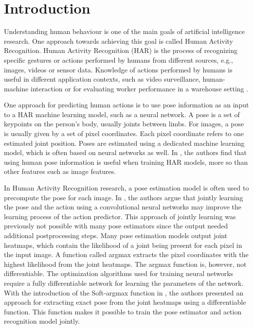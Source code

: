 \chapter{Introduction}

Understanding human behaviour is one of the main goals of artificial intelligence research.
One approach towards achieving this goal is called Human Activity Recognition. 
Human Activity Recognition (HAR) is the process of recognizing specific gestures or actions performed by humans from different sources, e.g., images, videos or sensor data.
Knowledge of actions performed by humans is useful in different application contexts, such as video surveillance, human-machine interaction or
for evaluating worker performance in a warehouse setting \cite{reining_towards_2018}.

One approach for predicting human actions is to use pose information as an input to a HAR machine learning model, such as a neural network.
A pose is a set of keypoints on the person's body, usually joints between limbs.
For images, a pose is usually given by a set of pixel coordinates.
Each pixel coordinate refers to one estimated joint position.
Poses are estimated using a dedicated machine learning model, which is often based on neural networks as well.
In \cite{jhuang_towards_2013}, the authors find that using human pose information is useful when training HAR models, more so than other features such as image features.

In Human Activity Recognition research, a pose estimation model is often used to precompute the pose for each image.
In \cite{luvizon_2d/3d_2018}, the authors argue that jointly learning the pose and the action using a convolutional neural networks may improve the learning process of the action predictor.
This approach of jointly learning was previously not possible with many pose estimators since the output needed additional postprocessing steps.
Many pose estimation models output joint heatmaps, which contain the likelihood of a joint being present for each pixel in the input image.
A function called argmax extracts the pixel coordinates with the highest likelihood from the joint heatmaps.
The argmax function is, however, not differentiable.
The optimization algorithms used for training neural networks require a fully differentiable network for learning the parameters of the network.
With the introduction of the Soft-argmax function in \cite{luvizon_human_2017}, the authors presented an approach for extracting exact pose from the joint heatmaps using a differentiable function.
This function makes it possible to train the pose estimator and action recognition model jointly.

